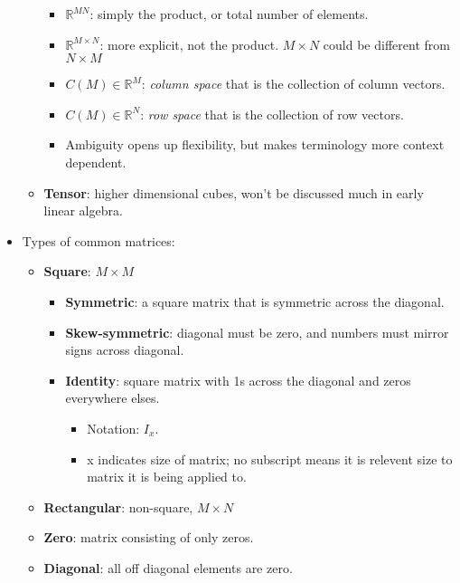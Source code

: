 \documentclass[12pt,a4paper]{article}
\begin{document}
\begin{itemize}
\begin{itemize}
                \begin{itemize}
                    \item \(\mathbb{R}^{MN}\): simply the product, or total number of elements.
                    \item \(\mathbb{R}^{M\times N}\): more explicit, not the product. \(M\times N\) could be different from \(N\times M\)
                    \item \(C(M)\in \mathbb{R}^M\): \textit{column space} that is the collection of column vectors.
                    \item \(C(M)\in \mathbb{R}^N\): \textit{row space} that is the collection of row vectors.
                    \item Ambiguity opens up flexibility, but makes terminology more context dependent.
                \end{itemize}
            \item \textbf{Tensor}: higher dimensional cubes, won't be discussed much in early linear algebra.
        \end{itemize}
    \item Types of common matrices:
        \begin{itemize}
            \item \textbf{Square}: \(M\times M\)
                \begin{itemize}
                    \item \textbf{Symmetric}: a square matrix that is symmetric across the diagonal.
                    \item \textbf{Skew-symmetric}: diagonal must be zero, and numbers must mirror signs across diagonal.
                    \item \textbf{Identity}: square matrix with 1s across the diagonal and zeros everywhere elses.
                    \begin{itemize}
                        \item Notation: \(I_x\).
                        \item x indicates size of matrix; no subscript means it is relevent size to matrix it is being applied to.
                    \end{itemize}
                \end{itemize}
            \item \textbf{Rectangular}: non-square, \(M\times N\)
            \item \textbf{Zero}: matrix consisting of only zeros.
            \item \textbf{Diagonal}: all off diagonal elements are zero.

\end{itemize}
\end{itemize}
\end{document}
